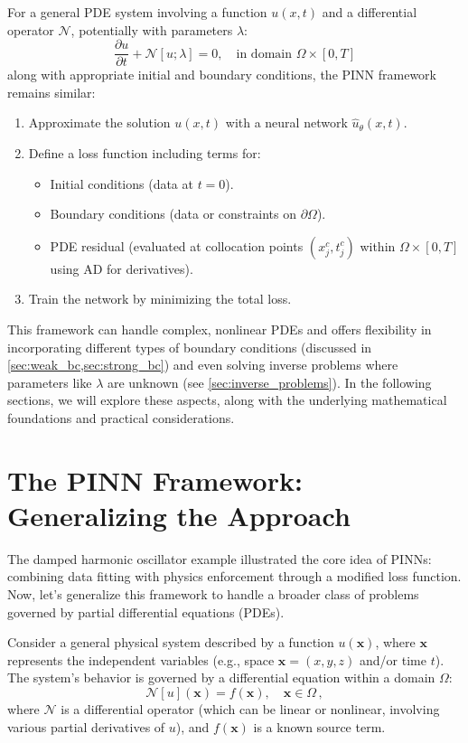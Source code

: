 For a general PDE system involving a function $u(x,t)$ and a differential operator $\mathcal{N}$, potentially with parameters $\lambda$:
\begin{equation*}
\frac{\partial u}{\partial t} + \mathcal{N}[u; \lambda] = 0, \quad \text{in domain } \Omega \times [0,T]
\end{equation*}
along with appropriate initial and boundary conditions, the PINN framework remains similar:
\begin{enumerate}
    \item Approximate the solution $u(x,t)$ with a neural network $\hat{u}_\theta(x,t)$.
    \item Define a loss function including terms for:
        \begin{itemize}
            \item Initial conditions (data at $t=0$).
            \item Boundary conditions (data or constraints on $\partial\Omega$).
            \item PDE residual (evaluated at collocation points $(x_j^c, t_j^c)$ within $\Omega \times [0,T]$ using AD for derivatives).
        \end{itemize}
    \item Train the network by minimizing the total loss.
\end{enumerate}

This framework can handle complex, nonlinear PDEs and offers flexibility in incorporating different types of boundary conditions (discussed in \cref{sec:weak_bc,sec:strong_bc}) and even solving inverse problems where parameters like $\lambda$ are unknown (see \cref{sec:inverse_problems}). In the following sections, we will explore these aspects, along with the underlying mathematical foundations and practical considerations.

\section{The PINN Framework: Generalizing the Approach}
\label{sec:pinn_framework}

The damped harmonic oscillator example illustrated the core idea of PINNs: combining data fitting with physics enforcement through a modified loss function.
Now, let's generalize this framework to handle a broader class of problems governed by partial differential equations (PDEs).

Consider a general physical system described by a function $u(\mathbf{x})$, where $\mathbf{x}$ represents the independent variables (e.g., space $\mathbf{x}=(x,y,z)$ and/or time $t$). The system's behavior is governed by a differential equation within a domain $\Omega$:
%
\begin{equation}
\mathcal{N}[u](\mathbf{x}) = f(\mathbf{x}), \quad \mathbf{x} \in \Omega \,,
\label{eq:pde_general}
\end{equation}
%
where $\mathcal{N}$ is a differential operator (which can be linear or nonlinear, involving various partial derivatives of $u$), and $f(\mathbf{x})$ is a known source term.

